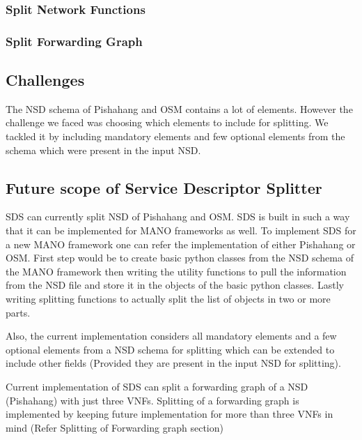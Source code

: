 \subsubsection{Split Network Functions}
\subsubsection{Split Forwarding Graph}

\subsection{Challenges}
The NSD schema of Pishahang and OSM contains a lot of elements. However the challenge we faced was choosing which elements to include for splitting. We tackled it by including mandatory elements and few optional elements from the schema which were present in the input NSD.
\subsection{Future scope of Service Descriptor Splitter}
SDS can currently split NSD of Pishahang and OSM. SDS is built in such a way that it can be implemented for MANO frameworks as well. To implement SDS for a new MANO framework one can refer the implementation of either Pishahang or OSM. First step would be to create basic python classes from the NSD schema of the MANO framework then writing the utility functions to pull the information from the NSD file and store it in the objects of the basic python classes. Lastly writing splitting functions to actually split the list of objects in two or more parts.

Also, the current implementation considers all mandatory elements and a few optional elements from a NSD schema for splitting which can be extended to include other fields (Provided they are present in the input NSD for splitting).

Current implementation of SDS can split a forwarding graph of a NSD (Pishahang) with just three VNFs. Splitting of a forwarding graph is implemented by keeping future implementation for more than three VNFs in mind (Refer Splitting of Forwarding graph section)



